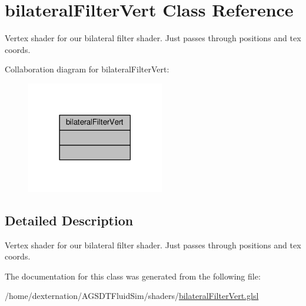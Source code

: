 \hypertarget{classbilateral_filter_vert}{\section{bilateral\-Filter\-Vert Class Reference}
\label{classbilateral_filter_vert}
}


Vertex shader for our bilateral filter shader. Just passes through positions and tex coords.  




Collaboration diagram for bilateral\-Filter\-Vert\-:\nopagebreak
\begin{figure}[H]
\begin{center}
\leavevmode
\includegraphics[width=170pt]{classbilateral_filter_vert__coll__graph}
\end{center}
\end{figure}


\subsection{Detailed Description}
Vertex shader for our bilateral filter shader. Just passes through positions and tex coords. 

The documentation for this class was generated from the following file\-:\begin{DoxyCompactItemize}
\item 
/home/dexternation/\-A\-G\-S\-D\-T\-Fluid\-Sim/shaders/\hyperlink{bilateral_filter_vert_8glsl}{bilateral\-Filter\-Vert.\-glsl}\end{DoxyCompactItemize}
